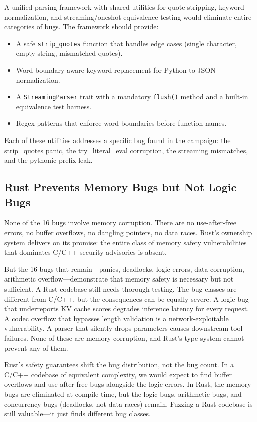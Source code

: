 A unified parsing framework with shared utilities for quote stripping, keyword normalization, and streaming/oneshot equivalence testing would eliminate entire categories of bugs. The framework should provide:
\begin{itemize}
  \item A safe \texttt{strip\_quotes} function that handles edge cases (single character, empty string, mismatched quotes).
  \item Word-boundary-aware keyword replacement for Python-to-JSON normalization.
  \item A \texttt{StreamingParser} trait with a mandatory \texttt{flush()} method and a built-in equivalence test harness.
  \item Regex patterns that enforce word boundaries before function names.
\end{itemize}
Each of these utilities addresses a specific bug found in the campaign: the strip\_quotes panic, the try\_literal\_eval corruption, the streaming mismatches, and the pythonic prefix leak.

\subsection{Rust Prevents Memory Bugs but Not Logic Bugs}

None of the 16 bugs involve memory corruption. There are no use-after-free errors, no buffer overflows, no dangling pointers, no data races. Rust's ownership system delivers on its promise: the entire class of memory safety vulnerabilities that dominates C/C++ security advisories is absent.

But the 16 bugs that remain---panics, deadlocks, logic errors, data corruption, arithmetic overflow---demonstrate that memory safety is necessary but not sufficient. A Rust codebase still needs thorough testing. The bug classes are different from C/C++, but the consequences can be equally severe. A logic bug that underreports KV cache scores degrades inference latency for every request. A codec overflow that bypasses length validation is a network-exploitable vulnerability. A parser that silently drops parameters causes downstream tool failures. None of these are memory corruption, and Rust's type system cannot prevent any of them.

\begin{insightbox}
Rust's safety guarantees shift the bug distribution, not the bug count. In a C/C++ codebase of equivalent complexity, we would expect to find buffer overflows and use-after-free bugs alongside the logic errors. In Rust, the memory bugs are eliminated at compile time, but the logic bugs, arithmetic bugs, and concurrency bugs (deadlocks, not data races) remain. Fuzzing a Rust codebase is still valuable---it just finds different bug classes.
\end{insightbox}

